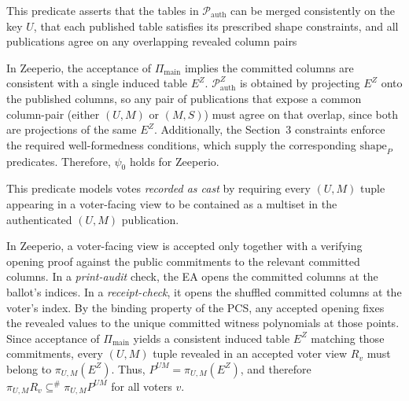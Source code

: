 
This predicate asserts that the tables in $\mathcal{P}_{\mathrm{auth}}$ can be merged consistently
on the key $U$, that each published table satisfies its prescribed shape constraints, and all publications agree on any overlapping revealed column pairs 

In Zeeperio, the acceptance of $\Pi_{\mathrm{main}}$ implies the committed columns are consistent with a single induced table $E^Z$. 
$\mathcal{P}_{\mathrm{auth}}^Z$ is obtained by projecting $E^Z$ onto the published columns, so any pair of publications that expose a common column-pair (either 
$(U,M)$ or $(M,S)$) must agree on that overlap, since both are projections of the same $E^Z$.
Additionally, the Section~3 constraints enforce the
required well-formedness conditions, which supply the corresponding
$\mathrm{shape}_P$ predicates. 
Therefore, $\psi_0$ holds for Zeeperio.



This predicate models votes \emph{recorded as cast} by requiring every $(U,M)$ tuple appearing in a voter-facing view
to be contained as a multiset in the authenticated $(U,M)$ publication.

In Zeeperio, a voter-facing view is accepted only together with a verifying opening proof against the
public commitments to the relevant committed columns. In a \emph{print-audit} check, the EA
opens the committed columns at the ballot's indices. In a \emph{receipt-check}, it opens the shuffled committed
columns at the voter’s index. By the binding property of the PCS, any accepted opening
fixes the revealed values to the unique committed witness polynomials at those points. 
Since acceptance of $\Pi_{\mathrm{main}}$ yields a consistent induced table $E^Z$ matching those commitments, every $(U,M)$ tuple
revealed in an accepted voter view $R_v$ must belong to $\pi_{U,M}(E^Z)$. 
Thus, $P^{UM}=\pi_{U,M}(E^Z)$, and therefore $\pi_{U,M}R_v \subseteq^{\#} \pi_{U,M}P^{UM}$ for all voters $v$. 


